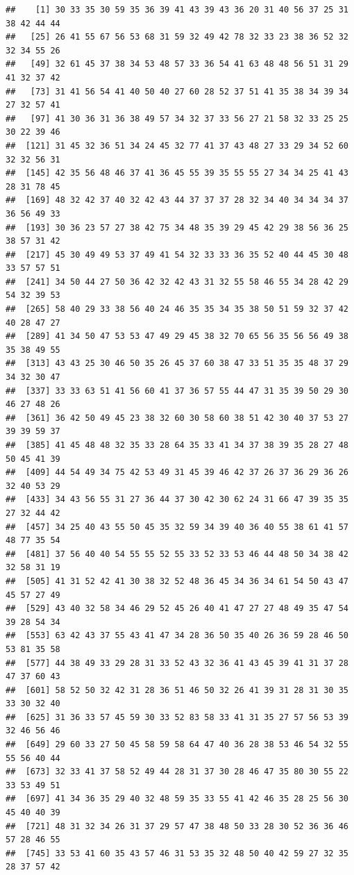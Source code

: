 \documentclass[
]{book}
\begin{document}
\begin{verbatim}
##    [1] 30 33 35 30 59 35 36 39 41 43 39 43 36 20 31 40 56 37 25 31 38 42 44 44
##   [25] 26 41 55 67 56 53 68 31 59 32 49 42 78 32 33 23 38 36 52 32 32 34 55 26
##   [49] 32 61 45 37 38 34 53 48 57 33 36 54 41 63 48 48 56 51 31 29 41 32 37 42
##   [73] 31 41 56 54 41 40 50 40 27 60 28 52 37 51 41 35 38 34 39 34 27 32 57 41
##   [97] 41 30 36 31 36 38 49 57 34 32 37 33 56 27 21 58 32 33 25 25 30 22 39 46
##  [121] 31 45 32 36 51 34 24 45 32 77 41 37 43 48 27 33 29 34 52 60 32 32 56 31
##  [145] 42 35 56 48 46 37 41 36 45 55 39 35 55 55 27 34 34 25 41 43 28 31 78 45
##  [169] 48 32 42 37 40 32 42 43 44 37 37 37 28 32 34 40 34 34 34 37 36 56 49 33
##  [193] 30 36 23 57 27 38 42 75 34 48 35 39 29 45 42 29 38 56 36 25 38 57 31 42
##  [217] 45 30 49 49 53 37 49 41 54 32 33 33 36 35 52 40 44 45 30 48 33 57 57 51
##  [241] 34 50 44 27 50 36 42 32 42 43 31 32 55 58 46 55 34 28 42 29 54 32 39 53
##  [265] 58 40 29 33 38 56 40 24 46 35 35 34 35 38 50 51 59 32 37 42 40 28 47 27
##  [289] 41 34 50 47 53 53 47 49 29 45 38 32 70 65 56 35 56 56 49 38 35 38 49 55
##  [313] 43 43 25 30 46 50 35 26 45 37 60 38 47 33 51 35 35 48 37 29 34 32 30 47
##  [337] 33 33 63 51 41 56 60 41 37 36 57 55 44 47 31 35 39 50 29 30 46 27 48 26
##  [361] 36 42 50 49 45 23 38 32 60 30 58 60 38 51 42 30 40 37 53 27 39 39 59 37
##  [385] 41 45 48 48 32 35 33 28 64 35 33 41 34 37 38 39 35 28 27 48 50 45 41 39
##  [409] 44 54 49 34 75 42 53 49 31 45 39 46 42 37 26 37 36 29 36 26 32 40 53 29
##  [433] 34 43 56 55 31 27 36 44 37 30 42 30 62 24 31 66 47 39 35 35 27 32 44 42
##  [457] 34 25 40 43 55 50 45 35 32 59 34 39 40 36 40 55 38 61 41 57 48 77 35 54
##  [481] 37 56 40 40 54 55 55 52 55 33 52 33 53 46 44 48 50 34 38 42 32 58 31 19
##  [505] 41 31 52 42 41 30 38 32 52 48 36 45 34 36 34 61 54 50 43 47 45 57 27 49
##  [529] 43 40 32 58 34 46 29 52 45 26 40 41 47 27 27 48 49 35 47 54 39 28 54 34
##  [553] 63 42 43 37 55 43 41 47 34 28 36 50 35 40 26 36 59 28 46 50 53 81 35 58
##  [577] 44 38 49 33 29 28 31 33 52 43 32 36 41 43 45 39 41 31 37 28 47 37 60 43
##  [601] 58 52 50 32 42 31 28 36 51 46 50 32 26 41 39 31 28 31 30 35 33 30 32 40
##  [625] 31 36 33 57 45 59 30 33 52 83 58 33 41 31 35 27 57 56 53 39 32 46 56 46
##  [649] 29 60 33 27 50 45 58 59 58 64 47 40 36 28 38 53 46 54 32 55 55 56 40 44
##  [673] 32 33 41 37 58 52 49 44 28 31 37 30 28 46 47 35 80 30 55 22 33 53 49 51
##  [697] 41 34 36 35 29 40 32 48 59 35 33 55 41 42 46 35 28 25 56 30 45 40 40 39
##  [721] 48 31 32 34 26 31 37 29 57 47 38 48 50 33 28 30 52 36 36 46 57 28 46 55
##  [745] 33 53 41 60 35 43 57 46 31 53 35 32 48 50 40 42 59 27 32 35 28 37 57 42

\end{verbatim}
\end{document}
